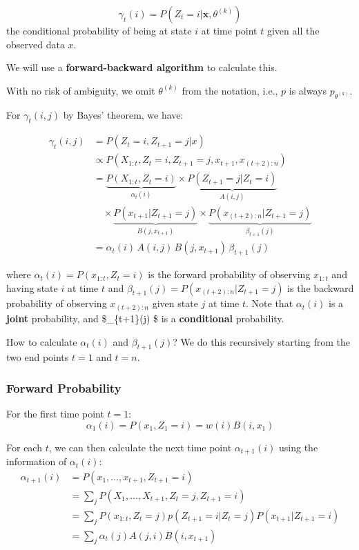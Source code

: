 \documentclass[
]{book}
\begin{document}
\[\gamma_t(i) = P(Z_t=i|\mathbf{x}, \theta^{(k)})\]
the conditional probability of being at state \(i\) at time point \(t\) given
all the observed data \(x\).

We will use a \textbf{forward-backward algorithm} to calculate this.

With no risk of ambiguity, we omit \(\theta^{(k)}\) from the notation, i.e., \(p\) is always \(p_{\theta^{(k)}}\).

For \(\gamma_t(i,j)\) by Bayes' theorem, we have:

\begin{align*}
\gamma_t(i,j) &= P(Z_t = i, Z_{t+1} = j |x)\\
& \propto P(X_{1:t}, Z_t=i, Z_{t+1}=j, x_{t+1}, x_{(t+2):n})\\
&=  \underbrace{P(X_{1:t}, Z_t=i)}_{\alpha_t(i)} \times  \underbrace{P( Z_{t+1}=j| Z_t=i)}_{A(i,j)}\\
&\quad \times  \underbrace{P(x_{t+1}|Z_{t+1}=j)}_{B(j, x_{t+1})} \times  \underbrace{P(x_{(t+2):n} | Z_{t+1}=j)}_{\beta_{t+1}(j)}\\
&= \alpha_t(i)\, A(i,j)\, B(j, x_{t+1})\, \beta_{t+1}(j)
\end{align*}

where \(\alpha_t(i) = P(x_{1:t}, Z_t=i)\) is the forward probability of observing \(x_{1:t}\) and having state \(i\) at time \(t\) and \(\beta_{t+1}(j) = P(x_{(t+2):n} | Z_{t+1}=j)\) is the backward probability of observing \(x_{(t+2):n}\) given state \(j\) at time \(t\). Note that \(\alpha_t(i)\) is a \textbf{joint} probability, and \$\beta\_\{t+1\}(j) \$ is a \textbf{conditional} probability.

How to calculate \(\alpha_t(i)\) and \(\beta_{t+1}(j)\)? We do this recursively starting from the two end points \(t = 1\) and \(t = n\).

\subsubsection*{Forward Probability}\label{forward-probability}

For the first time point \(t=1\):
\[\alpha_1(i) = P(x_1, Z_1=i) = w(i) B(i, x_1)\]

For each \(t\), we can then calculate the next time point \(\alpha_{t+1}(i)\) using the information of \(\alpha_t(i)\):
\begin{align*}
\alpha_{t+1}(i) &= P(x_1, \ldots, x_{t+1}, Z_{t+1}=i)\\
&= \sum_j P(X_1, \ldots, X_{t+1}, Z_t = j, Z_{t+1}=i)\\
&= \sum_j P(x_{1:t}, Z_t =j) p(Z_{t+1}=i|Z_t=j) P(x_{t+1}|Z_{t+1}=i)\\
&= \sum_j \alpha_t(j) A(j,i) B(i, x_{t+1})
\end{align*}
\end{document}
